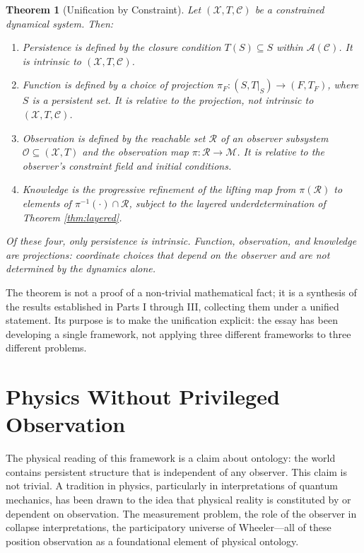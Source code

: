 \documentclass[12pt, a4paper, oneside]{article}
\theoremstyle{plain}
\newtheorem{theorem}{Theorem}[section]
\theoremstyle{definition}
\theoremstyle{remark}
\newcommand{\X}{\mathcal{X}}
\newcommand{\C}{\mathcal{C}}
\newcommand{\M}{\mathcal{M}}
\newcommand{\Obs}{\mathcal{O}}
\newcommand{\R}{\mathcal{R}}
\newcommand{\A}{\mathcal{A}}
\newcommand{\T}{T}
\newcommand{\proj}{\pi}
\begin{document}
\begin{theorem}[Unification by Constraint]
\label{thm:unification}
Let $(\X, \T, \C)$ be a constrained dynamical system. Then:

\begin{enumerate}
\item \emph{Persistence} is defined by the closure condition $\T(S) \subseteq S$ within $\A(\C)$. It is intrinsic to $(\X, \T, \C)$.

\item \emph{Function} is defined by a choice of projection $\proj_F : (S, \T|_S) \to (F, \T_F)$, where $S$ is a persistent set. It is relative to the projection, not intrinsic to $(\X, \T, \C)$.

\item \emph{Observation} is defined by the reachable set $\R$ of an observer subsystem $\Obs \subseteq (\X, \T)$ and the observation map $\proj : \R \to \M$. It is relative to the observer's constraint field and initial conditions.

\item \emph{Knowledge} is the progressive refinement of the lifting map from $\proj(\R)$ to elements of $\proj^{-1}(\cdot) \cap \R$, subject to the layered underdetermination of Theorem \ref{thm:layered}.
\end{enumerate}

Of these four, only persistence is intrinsic. Function, observation, and knowledge are projections: coordinate choices that depend on the observer and are not determined by the dynamics alone.
\end{theorem}

The theorem is not a proof of a non-trivial mathematical fact; it is a synthesis of the results established in Parts I through III, collecting them under a unified statement. Its purpose is to make the unification explicit: the essay has been developing a single framework, not applying three different frameworks to three different problems.

\section{Physics Without Privileged Observation}

The physical reading of this framework is a claim about ontology: the world contains persistent structure that is independent of any observer. This claim is not trivial. A tradition in physics, particularly in interpretations of quantum mechanics, has been drawn to the idea that physical reality is constituted by or dependent on observation. The measurement problem, the role of the observer in collapse interpretations, the participatory universe of Wheeler---all of these position observation as a foundational element of physical ontology.
\end{document}
